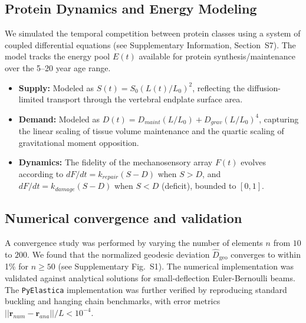 \subsection{Protein Dynamics and Energy Modeling}

We simulated the temporal competition between protein classes using a system of coupled differential equations (see Supplementary Information, Section~S7). The model tracks the energy pool $E(t)$ available for protein synthesis/maintenance over the 5--20 year age range.
\begin{itemize}
    \item \textbf{Supply:} Modeled as $S(t) = S_0 (L(t)/L_0)^2$, reflecting the diffusion-limited transport through the vertebral endplate surface area.
    \item \textbf{Demand:} Modeled as $D(t) = D_{maint} (L/L_0) + D_{grav} (L/L_0)^4$, capturing the linear scaling of tissue volume maintenance and the quartic scaling of gravitational moment opposition.
    \item \textbf{Dynamics:} The fidelity of the mechanosensory array $F(t)$ evolves according to $dF/dt = k_{repair}(S - D)$ when $S > D$, and $dF/dt = k_{damage}(S - D)$ when $S < D$ (deficit), bounded to $[0, 1]$.
\end{itemize}

\subsection{Numerical convergence and validation}

A convergence study was performed by varying the number of elements $n$ from $10$ to $200$. We found that the normalized geodesic deviation $\widehat{D}_{\mathrm{geo}}$ converges to within 1\% for $n \geq 50$ (see Supplementary Fig.~S1). The numerical implementation was validated against analytical solutions for small-deflection Euler-Bernoulli beams. The \texttt{PyElastica} implementation was further verified by reproducing standard buckling and hanging chain benchmarks, with error metrics $||\mathbf{r}_{num} - \mathbf{r}_{ana}||/L < 10^{-4}$.
